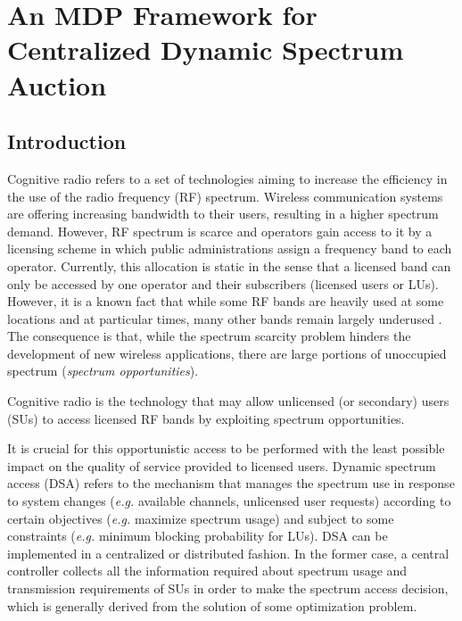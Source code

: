 \graphicspath{ {img/Sarnoff/} }
\chapter{An MDP Framework for Centralized Dynamic Spectrum Auction}\label{Sarnoff_chap}
\section{Introduction}
Cognitive radio refers to a set of technologies aiming to increase the efficiency in the use of the radio frequency (RF) spectrum.
Wireless communication systems are offering increasing bandwidth to their users, resulting in a higher spectrum demand. However, RF spectrum is scarce and operators gain access to it by a licensing scheme in which public administrations assign a frequency band to each operator. Currently, this allocation is static in the sense that a licensed band can only be accessed by one operator and their subscribers (licensed users or LUs).
However, it is a known fact that while some RF bands are heavily used at some locations and at particular times, many other bands remain largely underused \cite{ref:110}. 
The consequence is that, while the spectrum scarcity problem hinders the development of new wireless applications, there are large portions of unoccupied spectrum (\textit{spectrum opportunities}).

Cognitive radio is the technology that may allow unlicensed (or secondary) users (SUs) to access licensed RF bands by exploiting spectrum opportunities. 

It is crucial for this opportunistic access to be performed with the least possible impact on the quality of service provided to licensed users. 
Dynamic spectrum access (DSA) refers to the mechanism that manages the spectrum use in response to system changes (\textit{e.g.} available channels, unlicensed user requests) according to certain objectives (\textit{e.g.} maximize spectrum usage) and subject to some constraints (\textit{e.g.} minimum blocking probability for LUs). DSA can be implemented in a centralized or distributed fashion. In the former case, a central controller collects all the information required about spectrum usage and transmission requirements of SUs in order to make the spectrum access decision, which is generally derived from the solution of some optimization problem.

